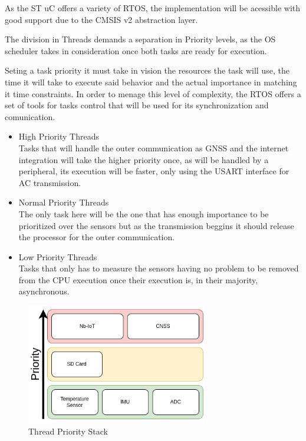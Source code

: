 As the ST uC offers a variety of RTOS, the implementation will be acessible with good support due to the
CMSIS v2 abstraction layer.

The division in Threads demands a separation in Priority levels, as the OS scheduler takes in consideration 
once both tasks are ready for execution.  

Seting a task priority it must take in vision the resources the task will use, the time it will take to execute said behavior
and the actual importance in matching it time constraints. In order to menage this level of complexity, the RTOS offers a set of
tools for tasks control that will be used for its synchronization and comunication.
\begin{itemize}
    \item High Priority Threads \\ 
    Tasks that will handle the outer communication as GNSS and the internet integration will take the higher priority once, as will be handled
    by a peripheral, its execution will be faster, only using the USART interface for AC transmission. 
    \item Normal Priority Threads \\
    The only task here will be the one that has enough importance to be prioritized over the sensors but as the transmission beggins it should release the processor
    for the outer communication.
    \item Low Priority Threads \\
    Tasks that only has to measure the sensors having no problem to be removed from the CPU execution
    once their execution is, in their majority, asynchronous.
    
\end{itemize}

\begin{figure}[H]
    \centering
    \includegraphics[width=0.7\textwidth]{images/diagrams/threads/thread.drawio.png}  %
    \caption{Thread Priority Stack}
    \label{fig:Thread Priority Stack}        
\end{figure}


